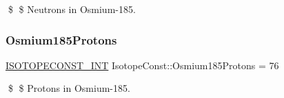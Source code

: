 \$ \$ Neutrons in Osmium-\/185. \mbox{\label{group___isotope_const-_osmium-_os185_ga253d728554adabde85d0602df9c13be4}} 
\subsubsection{\texorpdfstring{Osmium185\+Protons}{Osmium185Protons}}
{\footnotesize\ttfamily \mbox{\hyperlink{group___isotope_const-_macros_ga5f18360b3e99483a35c32d789e62621c}{I\+S\+O\+T\+O\+P\+E\+C\+O\+N\+S\+T\+\_\+\+I\+NT}} Isotope\+Const\+::\+Osmium185\+Protons = 76}

\$ \$ Protons in Osmium-\/185. 